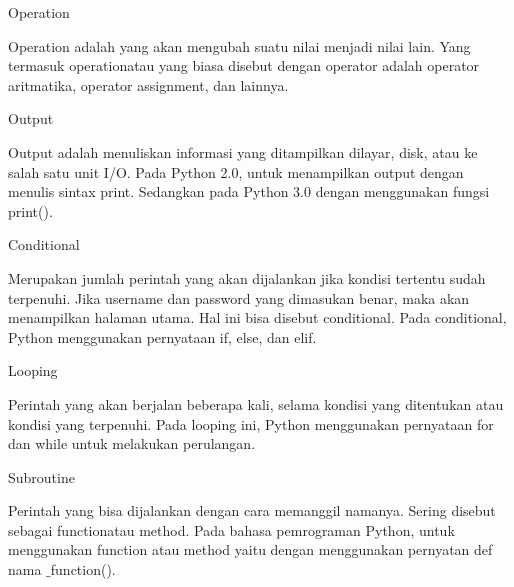 \vspace{14pt}
\noindent 
{\fontsize{14pt}{14pt}\selectfont Operation \\} \par
\noindent 
{\fontsize{14pt}{14pt}\selectfont Operation $  $adalah yang akan mengubah suatu nilai menjadi nilai lain. Yang termasuk $  $operationatau yang biasa disebut dengan operator adalah operator aritmatika, operator assignment, dan lainnya. \\} \par
\vspace{14pt}
\noindent 
{\fontsize{14pt}{14pt}\selectfont Output \\} \par
\noindent 
{\fontsize{14pt}{14pt}\selectfont Output $  $adalah menuliskan informasi yang ditampilkan dilayar, $  $disk, atau ke salah satu unit I/O. Pada Python 2.0, untuk menampilkan $  $output $  $dengan menulis sintax print. Sedangkan pada Python 3.0 dengan menggunakan fungsi print(). \\} \par
\vspace{14pt}
\noindent 
{\fontsize{14pt}{14pt}\selectfont Conditional \\} \par
\noindent 
{\fontsize{14pt}{14pt}\selectfont Merupakan jumlah perintah yang akan dijalankan jika kondisi tertentu sudah terpenuhi. Jika $  $username $  $dan $  $password $  $yang dimasukan benar, maka akan menampilkan halaman utama. Hal ini bisa disebut $  $conditional. $  $Pada $  $conditional, $  $Python menggunakan pernyataan if, else, dan elif. \\} \par
\vspace{14pt}
\noindent 
{\fontsize{14pt}{14pt}\selectfont Looping \\} \par
\noindent 
{\fontsize{14pt}{14pt}\selectfont Perintah yang akan berjalan beberapa kali, selama kondisi yang ditentukan atau kondisi yang terpenuhi. Pada $  $looping $  $ini, Python menggunakan pernyataan for dan while untuk melakukan perulangan. \\} \par
\vspace{14pt}
\noindent 
{\fontsize{14pt}{14pt}\selectfont Subroutine \\} \par
\noindent 
{\fontsize{14pt}{14pt}\selectfont Perintah yang bisa dijalankan dengan cara memanggil namanya. Sering disebut sebagai $  $functionatau $  $method. Pada bahasa pemrograman Python, untuk menggunakan $  $function $  $atau $  $method $  $yaitu dengan menggunakan pernyatan $  $def nama $  \_  $function(). \\} \par
